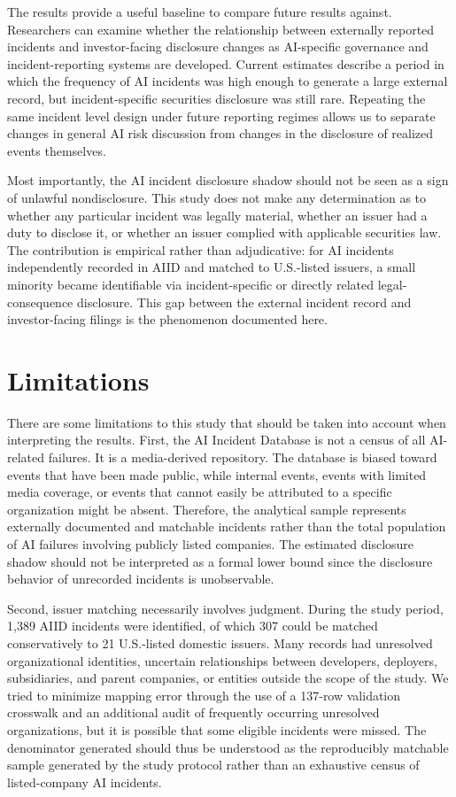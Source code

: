\documentclass[utf8]{FrontiersinHarvard}
\begin{document}
The results provide a useful baseline to compare future results against. Researchers can examine whether the relationship between externally reported incidents and investor-facing disclosure changes as AI-specific governance and incident-reporting systems are developed. Current estimates describe a period in which the frequency of AI incidents was high enough to generate a large external record, but incident-specific securities disclosure was still rare. Repeating the same incident level design under future reporting regimes allows us to separate changes in general AI risk discussion from changes in the disclosure of realized events themselves.

Most importantly, the AI incident disclosure shadow should not be seen as a sign of unlawful nondisclosure. This study does not make any determination as to whether any particular incident was legally material, whether an issuer had a duty to disclose it, or whether an issuer complied with applicable securities law. The contribution is empirical rather than adjudicative: for AI incidents independently recorded in AIID and matched to U.S.-listed issuers, a small minority became identifiable via incident-specific or directly related legal-consequence disclosure. This gap between the external incident record and investor-facing filings is the phenomenon documented here.

\section{Limitations}

There are some limitations to this study that should be taken into account when interpreting the results. First, the AI Incident Database is not a census of all AI-related failures. It is a media-derived repository. The database is biased toward events that have been made public, while internal events, events with limited media coverage, or events that cannot easily be attributed to a specific organization might be absent. Therefore, the analytical sample represents externally documented and matchable incidents rather than the total population of AI failures involving publicly listed companies. The estimated disclosure shadow should not be interpreted as a formal lower bound since the disclosure behavior of unrecorded incidents is unobservable.

Second, issuer matching necessarily involves judgment. During the study period, 1{,}389 AIID incidents were identified, of which 307 could be matched conservatively to 21 U.S.-listed domestic issuers. Many records had unresolved organizational identities, uncertain relationships between developers, deployers, subsidiaries, and parent companies, or entities outside the scope of the study. We tried to minimize mapping error through the use of a 137-row validation crosswalk and an additional audit of frequently occurring unresolved organizations, but it is possible that some eligible incidents were missed. The denominator generated should thus be understood as the reproducibly matchable sample generated by the study protocol rather than an exhaustive census of listed-company AI incidents.
\end{document}
